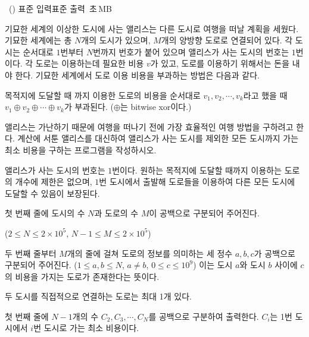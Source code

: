 \begin{problem}{\kcpcprobtrip\ (\kcpcprobtripshort)}
    {표준 입력}{표준 출력}
    {\kcpcprobtriptime\,초}{\kcpcprobtripmemory\,MB}{}
    
    기묘한 세계의 이상한 도시에 사는 앨리스는 다른 도시로 여행을 떠날 계획을 세웠다. 기묘한 세계에는 총 $N$개의 도시가 있으며, $M$개의 양방향 도로로 연결되어 있다. 각 도시는 순서대로 $1$번부터 $N$번까지 번호가 붙어 있으며 앨리스가 사는 도시의 번호는 $1$번이다. 각 도로는 이용하는데 필요한 비용 $v$가 있고, 도로를 이용하기 위해서는 돈을 내야 한다. 기묘한 세계에서 도로 이용 비용을 부과하는 방법은 다음과 같다.
    
    목적지에 도달할 때 까지 이용한 도로의 비용을 순서대로 $v_{1}, v_{2}, \cdots, v_{k}$라고 했을 때 $v_{1} \oplus v_{2} \oplus \cdots \oplus v_{k}$가 부과된다. ($\oplus$는 bitwise xor이다.)
    
    앨리스는 가난하기 때문에 여행을 떠나기 전에 가장 효율적인 여행 방법을 구하려고 한다. 계산에 서툰 앨리스를 대신하여 앨리스가 사는 도시를 제외한 모든 도시까지 가는 최소 비용을 구하는 프로그램을 작성하시오.
    
    앨리스가 사는 도시의 번호는 $1$번이다. 원하는 목적지에 도달할 때까지 이용하는 도로의 개수에 제한은 없으며, $1$번 도시에서 출발해 도로들을 이용하여 다른 모든 도시에 도달할 수 있음이 보장된다.
   
    \InputFile
    첫 번째 줄에 도시의 수 $N$과 도로의 수 $M$이 공백으로 구분되어 주어진다. 
    
    ($2 \le N \le 2 \times 10^5$,  $ N-1 \le M \le 2 \times 10^5$)
    
    두 번째 줄부터 $M$개의 줄에 걸쳐 도로의 정보를 의미하는 세 정수 $a, b, c$가 공백으로 구분되어 주어진다. ($1 \le a, b \le N$, $a \neq b$, $0 \le c \le 10^9$)
    이는 도시 $a$와 도시 $b$ 사이에 $c$의 비용을 가지는 도로가 존재한다는 뜻이다.
    
    두 도시를 직접적으로 연결하는 도로는 최대 1개 있다.
    
    \OutputFile
    첫 번째 줄에 $N-1$개의 수 $C_2, C_3, \cdots, C_{N}$를 공백으로 구분하여 출력한다. $C_i$는 1번 도시에서 $i$번 도시로 가는 최소 비용이다.
    
    \Examples
    \begin{example}
    \end{example}
    
\end{problem}

